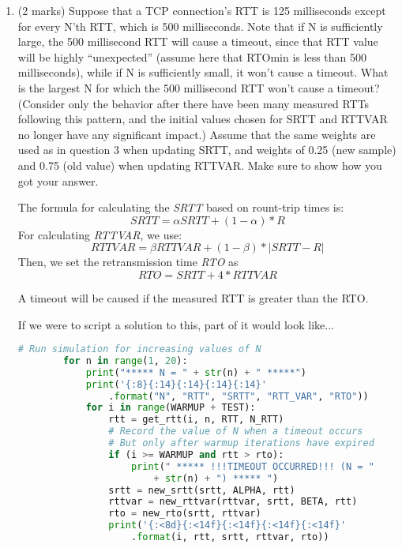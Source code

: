 \documentclass[10pt]{amsart}
\begin{document}
\begin{enumerate}
    \item (2 marks) Suppose that a TCP connection’s RTT is 125 milliseconds
        except for every N’th RTT, which is 500 milliseconds. Note that if N is
        sufficiently large, the 500 millisecond RTT will cause a timeout, since
        that RTT value will be highly “unexpected” (assume here that RTOmin is
        less than 500 milliseconds), while if N is sufficiently small, it won’t
        cause a timeout. What is the largest N for which the 500 millisecond RTT
        won’t cause a timeout? (Consider only the behavior after there have been
        many measured RTTs following this pattern, and the initial values chosen
        for SRTT and RTTVAR no longer have any significant impact.) Assume that
        the same weights are used as in question 3 when updating SRTT, and
        weights of 0.25 (new sample) and 0.75 (old value) when updating RTTVAR.
        Make sure to show how you got your answer.

        The formula for calculating the \textit{SRTT} based on rount-trip times is:
        \[ SRTT = \alpha SRTT + (1-\alpha) * R \]
        For calculating \textit{RTTVAR}, we use:
        \[ RTTVAR = \beta RTTVAR + (1-\beta) * |SRTT - R| \]
        Then, we set the retransmission time \textit{RTO} as 
        \[ RTO = SRTT + 4*RTTVAR \]

        A timeout will be caused if the measured RTT is greater than the RTO.

        If we were to script a solution to this, part of it would look like...

        \begin{lstlisting}[language=python]
        # Run simulation for increasing values of N
        for n in range(1, 20):
            print("***** N = " + str(n) + " *****")
            print('{:8}{:14}{:14}{:14}{:14}'
                .format("N", "RTT", "SRTT", "RTT_VAR", "RTO"))
            for i in range(WARMUP + TEST):
                rtt = get_rtt(i, n, RTT, N_RTT)
                # Record the value of N when a timeout occurs
                # But only after warmup iterations have expired
                if (i >= WARMUP and rtt > rto):
                    print(" ***** !!!TIMEOUT OCCURRED!!! (N = " 
                        + str(n) + ") ***** ")
                srtt = new_srtt(srtt, ALPHA, rtt)
                rttvar = new_rttvar(rttvar, srtt, BETA, rtt)
                rto = new_rto(srtt, rttvar)
                print('{:<8d}{:<14f}{:<14f}{:<14f}{:<14f}'
                    .format(i, rtt, srtt, rttvar, rto))
        \end{lstlisting}


\end{enumerate}
\end{document}
